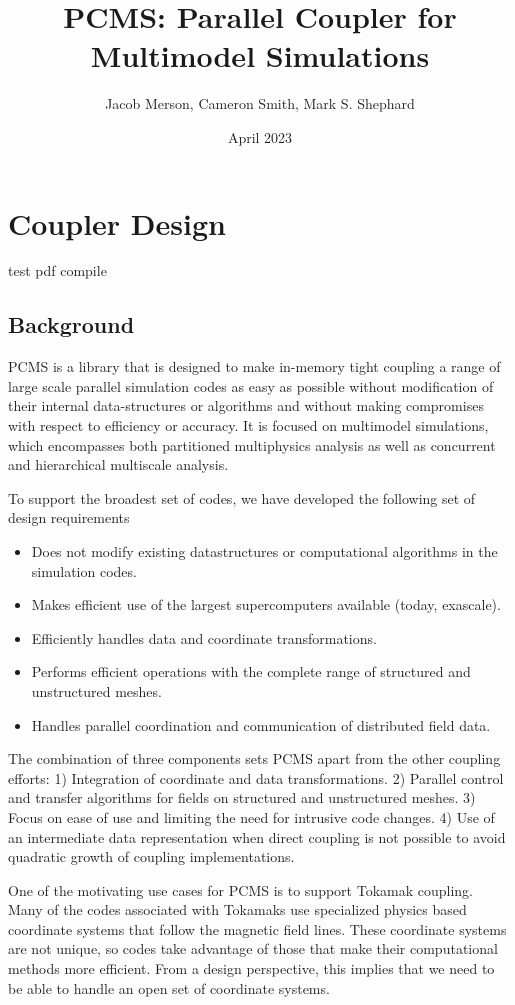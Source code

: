 \documentclass[12pt]{article}
\title{PCMS: Parallel Coupler for Multimodel Simulations}
\author{Jacob Merson, Cameron Smith, Mark S. Shephard}
\date{April 2023}
\begin{document}
\maketitle
\section{Coupler Design}
test pdf compile

\subsection{Background}
PCMS is a library that is designed to make in-memory tight coupling a range of large scale parallel simulation codes as easy as possible without modification of their internal data-structures or algorithms and without making compromises with respect to efficiency or accuracy. It is focused on multimodel simulations, which encompasses both partitioned multiphysics analysis as well as concurrent and hierarchical multiscale analysis.

To support the broadest set of codes, we have developed the following set of design requirements 
\begin{itemize}
    \item Does not modify existing datastructures or computational algorithms in the simulation codes.
    \item Makes efficient use of the largest supercomputers available (today, exascale).
    \item Efficiently handles data and coordinate transformations.
    \item Performs efficient operations with the complete range of structured and unstructured meshes.
    \item Handles parallel coordination and communication of distributed field data.
\end{itemize}

The combination of three components sets PCMS apart from the other coupling efforts: 1) Integration of coordinate and data transformations. 2) Parallel control and transfer algorithms for fields on structured and unstructured meshes. 3) Focus on ease of use and limiting the need for intrusive code changes. 4) Use of an intermediate data representation when direct coupling is not possible to avoid quadratic growth of coupling implementations.

One of the motivating use cases for PCMS is to support Tokamak coupling. Many of the codes associated with Tokamaks use specialized physics based coordinate systems that follow the magnetic field lines. These coordinate systems are not unique, so codes take advantage of those that make their computational methods more efficient. From a design perspective, this implies that we need to be able to handle an open set of coordinate systems.
\end{document}
